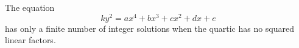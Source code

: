 \begin{proposition}
    The equation
\[
    ky^2=ax^4+bx^3+cx^2+dx+e
\]
    has only a finite number of integer solutions when the quartic has no squared linear factors.
\end{proposition}
